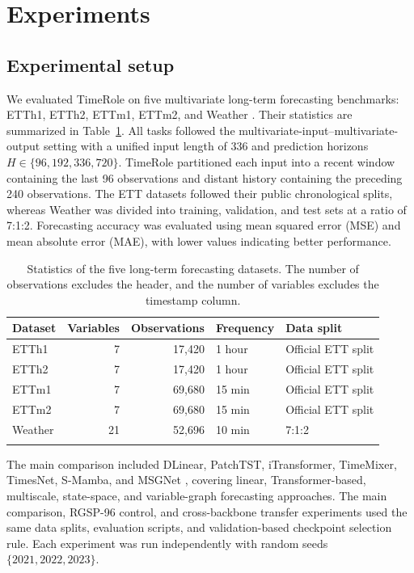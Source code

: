 \section{Experiments}

\subsection{Experimental setup}

We evaluated TimeRole on five multivariate long-term forecasting benchmarks: ETTh1, ETTh2, ETTm1, ETTm2, and Weather \citep{Zhou2021Informer,Wu2021Autoformer,THUML2026TSLibDataset}. Their statistics are summarized in Table~\ref{tab:datasets}. All tasks followed the multivariate-input--multivariate-output setting with a unified input length of 336 and prediction horizons \(H\in\{96,192,336,720\}\). TimeRole partitioned each input into a recent window containing the last 96 observations and distant history containing the preceding 240 observations. The ETT datasets followed their public chronological splits, whereas Weather was divided into training, validation, and test sets at a ratio of 7:1:2. Forecasting accuracy was evaluated using mean squared error (MSE) and mean absolute error (MAE), with lower values indicating better performance.

\begin{table}[t]
\tablecaptionfont
\caption{Statistics of the five long-term forecasting datasets. The number of observations excludes the header, and the number of variables excludes the timestamp column.}
\label{tab:datasets}
\centering
\tablebodyfont
\setlength{\tabcolsep}{3pt}
\renewcommand{\arraystretch}{1.05}
\begin{tabular}{@{}lrrll@{}}
\toprule\noalign{}
Dataset & Variables & Observations & Frequency & Data split \\
\midrule\noalign{}
ETTh1 & 7 & 17,420 & 1 hour & Official ETT split \\
ETTh2 & 7 & 17,420 & 1 hour & Official ETT split \\
ETTm1 & 7 & 69,680 & 15 min & Official ETT split \\
ETTm2 & 7 & 69,680 & 15 min & Official ETT split \\
Weather & 21 & 52,696 & 10 min & 7:1:2 \\
\bottomrule\noalign{}
\end{tabular}
\end{table}

The main comparison included DLinear, PatchTST, iTransformer, TimeMixer, TimesNet, S-Mamba, and MSGNet \citep{Zeng2023DLinear,Nie2023PatchTST,Liu2024iTransformer,Wang2024TimeMixer,Wu2023TimesNet,Wang2025SMamba,Cai2024MSGNet}, covering linear, Transformer-based, multiscale, state-space, and variable-graph forecasting approaches. The main comparison, RGSP-96 control, and cross-backbone transfer experiments used the same data splits, evaluation scripts, and validation-based checkpoint selection rule. Each experiment was run independently with random seeds \(\{2021,2022,2023\}\).

